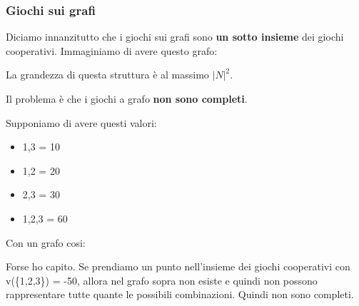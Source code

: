 \subsubsection{Giochi sui grafi}

Diciamo innanzitutto che i giochi sui grafi sono \textbf{un sotto insieme} dei
giochi cooperativi. Immaginiamo di avere questo grafo:

\begin{figure}[H]
    \begin{center}
    \end{center}
\end{figure}
La grandezza di questa struttura è al massimo $|N|^2$.

Il problema è che i giochi a grafo \textbf{non sono completi}.

Supponiamo di avere questi valori:
\begin{itemize}
    \item 1,3 = 10
    \item 1,2 = 20
    \item 2,3 = 30
    \item 1,2,3 = 60
\end{itemize}

Con un grafo cosi:
\begin{figure}[H]
    \begin{center}
    \end{center}
\end{figure}
Forse ho capito. Se prendiamo un punto nell'insieme dei giochi cooperativi con v(\{1,2,3\}) = -50, allora nel grafo sopra non esiste e quindi non possono
rappresentare tutte quante le possibili combinazioni. Quindi non sono completi.

